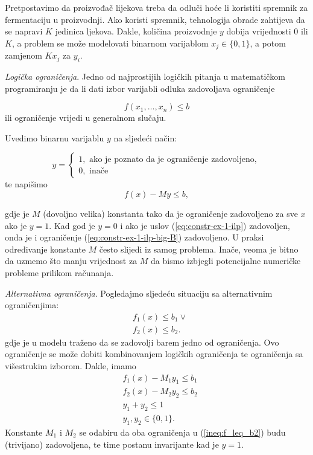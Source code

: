 \documentclass[a4paper, utf8, 11pt, colorlinks]{book}
\begin{document}
Pretpostavimo da proizvođač lijekova treba da odluči hoće li koristiti spremnik za fermentaciju u proizvodnji. Ako koristi spremnik, tehnologija obrade zahtijeva da se napravi $K$ jedinica ljekova. Dakle, količina proizvodnje $y$ dobija vrijednosti 0 ili $K$, a problem se može modelovati binarnom varijablom $x_j \in \{ 0, 1\}$, a potom zamjenom $Kx_j$ za $y_i$. 

\emph{Logička ograničenja}. Jedno od najprostijih logičkih pitanja u matematičkom programiranju je da li dati izbor varijabli odluka zadovoljava ograničenje

\begin{equation}\label{eq:constr-ex-1-ilp}
   f(x_1,\ldots, x_n )\leq b
\end{equation}
 ili   ograničenje vrijedi u generalnom slučaju.
 
 Uvedimo binarnu varijablu $y$ na sljedeći način:
 
$$y =\begin{cases}
1, \mbox{ ako je poznato da je ograničenje zadovoljeno}, \\
0, \mbox{ inače}
\end{cases}$$
te napišimo 
\begin{equation}\label{eq:constr-ex-1-ilp-big-B}
   f(x) - M y \leq b,
\end{equation}

gdje je $M$ (dovoljno velika) konstanta tako da je 
ograničenje zadovoljeno za sve $x$ ako je $y =1$. Kad god je $y=0$ i ako je uslov (\ref{eq:constr-ex-1-ilp}) zadovoljen, onda je i ograničenje (\ref{eq:constr-ex-1-ilp-big-B}) zadovoljeno. U praksi   određivanje konstante $M$ često slijedi iz samog problema. Inače, veoma je bitno da uzmemo što manju vrijednost za $M$ da bismo izbjegli potencijalne numeričke probleme prilikom računanja. 

\emph{Alternativna ograničenja}. Pogledajmo sljedeću situaciju sa alternativnim ograničenjima:
\begin{align}
     &f_1(x) \leq b_1 \vee \nonumber\\
     &f_2(x) \leq b_2.\label{ineq:f_leq_b2}
\end{align}
gdje je u modelu traženo da se zadovolji barem jedno od ograničenja. 
Ovo ograničenje se može dobiti kombinovanjem logičkih ograničenja te ograničenja sa višestrukim izborom. Dakle, imamo 
\begin{align*}
      &f_1(x) - M_1 y_1  \leq b_1 \\
      &f_2(x) - M_2 y_2  \leq b_2 \\
      & y_1 + y_2 \leq 1 \\
      & y_1, y_2 \in \{0, 1\}.
\end{align*}
Konstante $M_1$ i $M_2$ se odabiru da oba ograničenja u (\ref{ineq:f_leq_b2})  budu (trivijano) zadovoljena, te time postanu invarijante kad je $y=1$.
\end{document}
